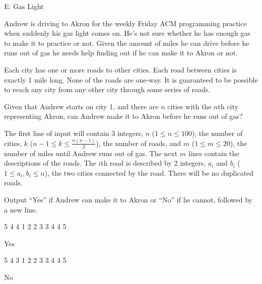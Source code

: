 \begin{problem}{E: Gas Light}

Andrew is driving to Akron for the weekly Friday ACM programming practice when suddenly his gas light comes on.
He's not sure whether he has enough gas to make it to practice or not.
Given the amount of miles he can drive before he runs out of gas he needs help finding out if he can make it to Akron or not.

Each city has one or more roads to other cities.
Each road between cities is exactly 1 mile long.
None of the roads are one-way.
It is guaranteed to be possible to reach any city from any other city through some series of roads.

Given that Andrew starts on city 1, and there are $n$ cities with the $n$th city representing Akron, can Andrew make it to Akron before he runs out of gas?
\end{problem}

\begin{formalin}
The first line of input will contain 3 integers, $n$ ($1 \leq n \leq 100$), the number of cities, $k$ ($n - 1 \leq k \leq \frac {n(n-1)}{2}$), the number of roads, and $m$ ($1 \leq m \leq 20$), the number of miles until Andrew runs out of gas.
The next $m$ lines contain the descriptions of the roads.
The $i$th road is described by 2 integers, $a_i$ and $b_i$ ($1 \leq a_i, b_i \leq n$), the two cities connected by the road.
There will be no duplicated roads.
\end{formalin}

\begin{formalout}
Output ``Yes'' if Andrew can make it to Akron or ``No'' if he cannot, followed by a new line.
\end{formalout}

\begin{datain}
5 4 4
1 2
2 3
3 4
4 5
\end{datain}
\begin{dataout}
Yes
\end{dataout}

\begin{datain}
5 4 3
1 2
2 3
3 4
4 5
\end{datain}
\begin{dataout}
No
\end{dataout}
